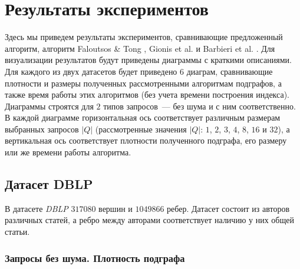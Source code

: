 \section{Результаты экспериментов}

 Здесь мы приведем результаты экспериментов, сравнивающие предложенный алгоритм, алгоритм Faloutsos \& Tong \cite{Faloutsos06}, Gionis et al. \cite{Gionis15} и Barbieri et al. \cite{Barbieri15}. Для визуализации результатов будут приведены диаграммы с краткими описаниями. Для каждого из двух датасетов будет приведено $6$ диаграм, сравнивающие плотности и размеры полученных рассмотренными алгоритмам подграфов, а также время работы этих алгоритмов (без учета времени построения индекса). Диаграммы строятся для $2$ типов запросов~--- без шума и с ним соответственно. В каждой диаграмме горизонтальная ось соответствует различным размерам выбранных запросов $|Q|$ (рассмотренные значения $|Q|$: $1$, $2$, $3$, $4$, $8$, $16$ и $32$), а вертикальная ось соответствует плотности полученного подграфа, его размеру или же времени работы алгоритма.

\subsection{Датасет DBLP}

В датасете \textit{DBLP} $317080$ вершин и $1049866$ ребер. Датасет состоит из авторов различных статей, а ребро между авторами соответствует наличию у них общей статьи.

\subsubsection{Запросы без шума. Плотность подграфа}

  \begin{center}
  \end{center}

